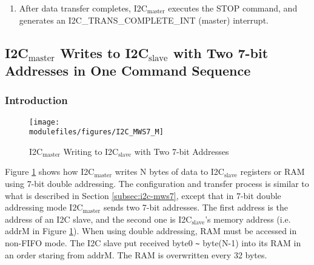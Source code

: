 \documentclass[main\_\_EN.tex]{subfiles}
\begin{document}
\begin{enumerate}
If data to be received is larger than 32 bytes, the other way is to enable clock stretching by setting \hyperref[fielddesc:I2CSLAVESCLSTRETCHEN]{I2C\_SLAVE\_SCL\_STRETCH\_EN} (slave), and clearing \hyperref[fielddesc:I2CRXFULLACKLEVEL]{I2C\_RX\_FULL\_ACK\_LEVEL} to 0. When RX RAM is full, an \hyperref[int:i2c-slave-stretch]{I2C\_SLAVE\_STRETCH\_INT} (slave) interrupt is generated. In this way, I2C$_\text{slave}$ can hold SCL low, in exchange for more time to read data. After software has finished reading, you can set \hyperref[fielddesc:I2CSLAVESTRETCHINTCLR]{I2C\_SLAVE\_STRETCH\_INT\_CLR} (slave) to 1 to clear interrupt, and set \hyperref[fielddesc:I2CSLAVESCLSTRETCHCLR]{I2C\_SLAVE\_SCL\_STRETCH\_CLR} (slave) to release the SCL line.

\item After data transfer completes, I2C$_\text{master}$ executes the STOP command, and generates an I2C\_TRANS\_COMPLETE\_INT (master) interrupt.

\end{enumerate}



\subsection{\texorpdfstring{I2C$_\text{master}$ Writes to I2C$_\text{slave}$ with Two 7-bit Addresses in One Command Sequence}{I2C master Writes to I2C slave with Two 7-bit Addresses in One Command Sequence}}
\subsubsection{Introduction}
\begin{figure}[H]
    \centering
    \texttt{[image: \\modulefiles/figures/I2C\_MWS7\_M]}
    \caption{I2C$_\text{master}$ Writing to I2C$_\text{slave}$ with Two 7-bit Addresses}
    \label{fig:i2c-mws7-double}
\end{figure}

Figure \ref{fig:i2c-mws7-double} shows how I2C$_\text{master}$ writes N bytes of data to I2C$_\text{slave}$ registers or RAM using 7-bit double addressing. The configuration and transfer process is similar to what is described in Section \ref{subsec:i2c-mws7}, except that in 7-bit double addressing mode I2C$_\text{master}$ sends two 7-bit addresses. The first address is the address of an I2C slave, and the second one is I2C$_\text{slave}$'s memory address (i.e. addrM in Figure \ref{fig:i2c-mws7-double}). When using double addressing, RAM must be accessed in non-FIFO mode.
The I2C slave put received byte0 \verb+~+ byte(N-1) into its RAM in an order staring from addrM. The RAM is overwritten every 32 bytes.
\end{document}
